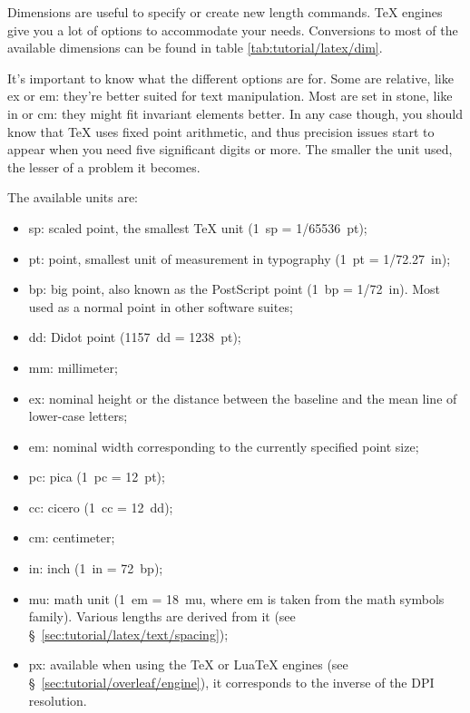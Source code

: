 Dimensions are useful to specify or create new length \glspl{command}. \TeX{} engines give you a lot of options to accommodate your needs. Conversions to most of the available dimensions can be found in table \ref{tab:tutorial/latex/dim}.

It's important to know what the different options are for. Some are relative, like ex or em: they're better suited for text manipulation. Most are set in stone, like in or cm: they might fit invariant elements better. In any case though, you should know that \TeX{} uses fixed point arithmetic, and thus precision issues start to appear when you need five significant digits or more. The smaller the unit used, the lesser of a problem it becomes.

\noindent The available units are:
\begin{itemize}
    \item sp: scaled point, the smallest \TeX{} unit (1~sp = 1/65536~pt);
    \item pt: point, smallest unit of measurement in typography (1~pt = 1/72.27~in);
    \item bp: big point, also known as the PostScript point (1~bp = 1/72~in). Most used as a normal point in other software suites;
    \item dd: Didot point (1157~dd = 1238~pt);
    \item mm: millimeter;
    \item ex: nominal height or the distance between the baseline and the mean line of lower-case letters;
    \item em: nominal width corresponding to the currently specified point size;
    \item pc: pica (1~pc = 12~pt);
    \item cc: cicero (1~cc = 12~dd);
    \item cm: centimeter;
    \item in: inch (1~in = 72~bp);
    \item mu: math unit (1~em = 18~mu, where em is taken from the math symbols family). Various lengths are derived from it (see \S~\ref{sec:tutorial/latex/text/spacing});
    \item px: available when using the \TeX{} or Lua\TeX{} engines (see \S~\ref{sec:tutorial/overleaf/engine}), it corresponds to the inverse of the \gls{DPI} resolution.
\end{itemize}

\begingroup
    \scriptsize
    \setlength{\columnA}{\dimexpr \linewidth/16}
    \setlength{\columnB}{\dimexpr \linewidth/10-\columnA/10}
    \setlength{\columnC}{\dimexpr \linewidth/10-\columnA/10}
    \setlength{\columnD}{\dimexpr \linewidth/10-\columnA/10}
    \setlength{\columnE}{\dimexpr \linewidth/10-\columnA/10}
    \setlength{\columnF}{\dimexpr \linewidth/10-\columnA/10}
    \setlength{\columnG}{\dimexpr \linewidth/10-\columnA/10}
    \setlength{\columnH}{\dimexpr \linewidth/10-\columnA/10}
    \setlength{\columnI}{\dimexpr \linewidth/10-\columnA/10}
    \setlength{\columnJ}{\dimexpr \linewidth/10-\columnA/10}
    \setlength{\columnK}{\dimexpr \linewidth/10-\columnA/10}
    
